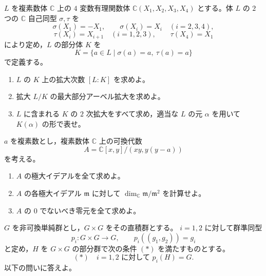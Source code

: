 \newcommand{\C}{\mathbb{C}}
\newcommand{\R}{\mathbb{R}}
\newcommand{\Z}{\mathbb{Z}}
\newcommand{\Tr}{\operatorname{Tr}}
\newcommand{\Impart}{\operatorname{Im}}
\newcommand{\AF}{\operatorname{AF}}
\newcommand{\AX}{\operatorname{AX}}
\newcommand{\GL}{\operatorname{GL}}


\(L\) を複素数体 \(\C\) 上の \(4\) 変数有理関数体
\(\C(X_1,X_2,X_3,X_4)\) とする。体 \(L\) の \(2\) つの \(\C\) 自己同型 \(\sigma,\tau\) を
\[
  \sigma(X_1)=-X_1,\qquad
  \sigma(X_i)=X_i\quad (i=2,3,4),
\]
\[
  \tau(X_i)=X_{i+1}\quad (i=1,2,3),\qquad
  \tau(X_4)=X_1
\]
により定め，\(L\) の部分体 \(K\) を
\[
  K=\{a\in L\mid \sigma(a)=a,\ \tau(a)=a\}
\]
で定義する。

\begin{enumerate}
  \item \(L\) の \(K\) 上の拡大次数 \([L:K]\) を求めよ。
  \item 拡大 \(L/K\) の最大部分アーベル拡大を求めよ。
  \item \(L\) に含まれる \(K\) の \(2\) 次拡大をすべて求め，適当な \(L\) の元 \(\alpha\) を用いて \(K(\alpha)\) の形で表せ。
\end{enumerate}


\(a\) を複素数とし，複素数体 \(\C\) 上の可換代数
\[
  A=\C[x,y]/(xy,y(y-a))
\]
を考える。

\begin{enumerate}
  \item \(A\) の極大イデアルを全て求めよ。
  \item \(A\) の各極大イデアル \(\mathfrak m\) に対して \(\dim_{\C}\mathfrak m/\mathfrak m^2\) を計算せよ。
  \item \(A\) の \(0\) でないべき零元を全て求めよ。
\end{enumerate}


\(G\) を非可換単純群とし，\(G\times G\) をその直積群とする。
\(i=1,2\) に対して群準同型
\[
  p_i:G\times G\longrightarrow G,\qquad
  p_i((g_1,g_2))=g_i
\]
と定め，\(H\) を \(G\times G\) の部分群で次の条件 \((*)\) を満たすものとする。
\[
  (*)\quad i=1,2\text{ に対して }p_i(H)=G.
\]
以下の問いに答えよ。

